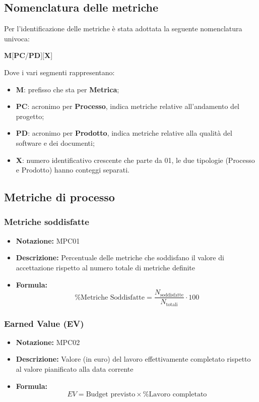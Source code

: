 \documentclass[a4paper,12pt]{article}
\begin{document}
    \subsection{Nomenclatura delle metriche}
        Per l'identificazione delle metriche è stata adottata la seguente nomenclatura univoca:
        \begin{center}
            \textbf{M}[\textbf{PC}/\textbf{PD}][\textbf{X}]
        \end{center}
        Dove i vari segmenti rappresentano:
        \begin{itemize}
            \item \textbf{M}: prefisso che sta per \textbf{Metrica};
            \item \textbf{PC}: acronimo per \textbf{Processo}, indica metriche relative all'andamento del progetto;
            \item \textbf{PD}: acronimo per \textbf{Prodotto}, indica metriche relative alla qualità del software e dei documenti;
            \item \textbf{X}: numero identificativo crescente che parte da 01, le due tipologie (Processo e Prodotto) hanno conteggi separati.
        \end{itemize}

    \subsection{Metriche di processo}
        \label{sec:metproc}
        \subsubsection{Metriche soddisfatte}
            \begin{itemize}
                \item \textbf{Notazione:} MPC01
                \item \textbf{Descrizione:} Percentuale delle metriche che soddisfano il valore di accettazione rispetto al numero totale di metriche definite
                \item \textbf{Formula:} 
                \[ \%\text{Metriche Soddisfatte} = \frac{N_\text{soddisfatte}}{N_\text{totali}} \cdot 100 \]
            \end{itemize}

        \subsubsection{Earned Value (EV)}
            \begin{itemize}
                \item \textbf{Notazione:} MPC02
                \item \textbf{Descrizione:} Valore (in euro) del lavoro effettivamente completato rispetto al valore pianificato alla data corrente
                \item \textbf{Formula:} 
                \[ EV = \text{Budget previsto} \times \%\text{Lavoro completato} \]
            \end{itemize}
\end{document}
